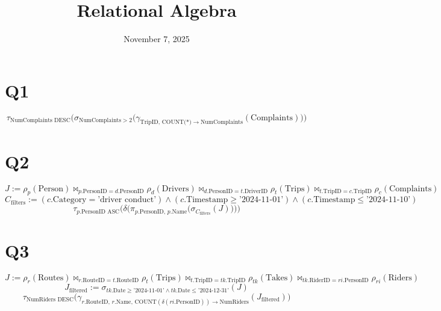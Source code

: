\documentclass{article}
\title{Relational Algebra}
\date{November 7, 2025}
\begin{document}
\maketitle

\section{Q1}
\begin{dmath*}
\tau_{\text{NumComplaints DESC}}\Big(
  \sigma_{\text{NumComplaints} > 2}\Big(
    \gamma_{\text{TripID},\,\text{COUNT(*)}\rightarrow\text{NumComplaints}}(\text{Complaints})
  \Big)
\Big)
\end{dmath*}

\section{Q2}
\begin{dmath*}
J := \rho_{p}(\text{Person})
  \bowtie_{p.\text{PersonID}=d.\text{PersonID}} \rho_{d}(\text{Drivers})
  \bowtie_{d.\text{PersonID}=t.\text{DriverID}} \rho_{t}(\text{Trips})
  \bowtie_{t.\text{TripID}=c.\text{TripID}} \rho_{c}(\text{Complaints})
\end{dmath*}
\begin{dmath*}
C_{\text{filters}} :=
  (c.\text{Category}=\text{'driver conduct'})
  \wedge (c.\text{Timestamp}\ge \text{'2024-11-01'})
  \wedge (c.\text{Timestamp}\le \text{'2024-11-10'})
\end{dmath*}
\begin{dmath*}
\tau_{p.\text{PersonID ASC}}\Big(
  \delta\big(\pi_{p.\text{PersonID},\,p.\text{Name}}\big(
    \sigma_{C_{\text{filters}}}(J)
  \big)\big)
\Big)
\end{dmath*}

\section{Q3}
\begin{dmath*}
J := \rho_{r}(\text{Routes})
  \bowtie_{r.\text{RouteID}=t.\text{RouteID}} \rho_{t}(\text{Trips})
  \bowtie_{t.\text{TripID}=tk.\text{TripID}} \rho_{tk}(\text{Takes})
  \bowtie_{tk.\text{RiderID}=ri.\text{PersonID}} \rho_{ri}(\text{Riders})
\end{dmath*}
\begin{dmath*}
J_{\text{filtered}} :=
  \sigma_{tk.\text{Date}\ge \text{'2024-11-01'} \wedge tk.\text{Date}\le \text{'2024-12-31'}}(J)
\end{dmath*}
\begin{dmath*}
\tau_{\text{NumRiders DESC}}\Big(
  \gamma_{r.\text{RouteID},\,r.\text{Name},\,\text{COUNT}(\delta(ri.\text{PersonID}))\rightarrow\text{NumRiders}}(J_{\text{filtered}})
\Big)
\end{dmath*}
\end{document}
